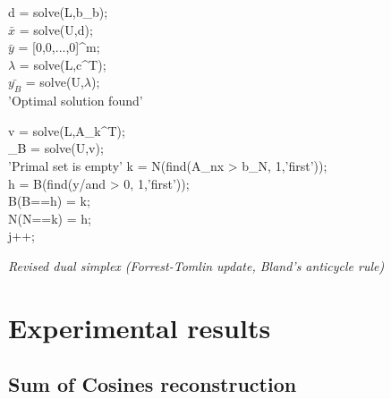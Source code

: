 \documentclass[journal,article,submit,electronics,pdftex]{Definitions/mdpi}
\begin{document}
{\begin{algorithm}[h]
{    
    d = solve(L,b_b);\\
    \vspace{5pt}
    $\bar{x}$ = solve(U,d);\\
    \vspace{5pt}
    $\bar{y}$ = [0,0,...,0]^m;\\
    \vspace{5pt}
    $\lambda$ = solve(L,c^T);\\
    \vspace{5pt}
    $\bar{y_B}$ = solve(U,$\lambda$);\\
    \vspace{5pt}
    {
        \Return \: 'Optimal solution found'
    }
    
    
    \vspace{5pt}
    v = solve(L,A_k^T);\\
    \vspace{5pt}
    \eta_B = solve(U,v);\\
    
    {
        \Return \: 'Primal set is empty'
    }
    k = N(find(A_nx > b_N, 1,\:'first'));\\
    h = B(find(y/\eta \:and\: \eta > 0, 1,\:'first'));\\
    \vspace{5pt}
    B(B==h) = k;\\
    \vspace{5pt}
    N(N==k) = h; \\
    \vspace{5pt}
    j++;
   }
\caption{\emph{Revised dual simplex (Forrest-Tomlin update, Bland's anticycle rule)}}
\end{algorithm}

\clearpage
\section{Experimental results}

\subsection{Sum of Cosines reconstruction}
\label{results:cosine}

}
\end{document}
